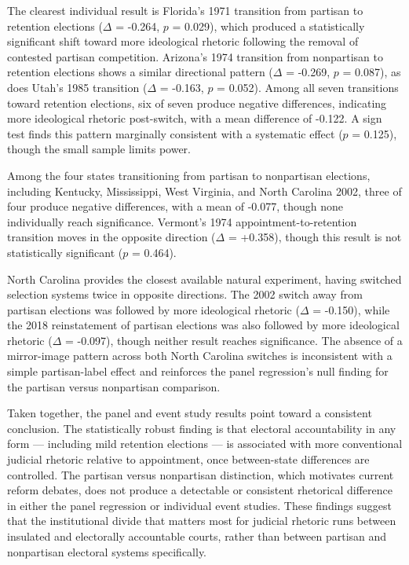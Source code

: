 The clearest individual result is Florida's 1971 transition from
partisan to retention elections (\(\Delta\) = -0.264, \(p\) = 0.029),
which produced a statistically significant shift toward more ideological
rhetoric following the removal of contested partisan competition.
Arizona's 1974 transition from nonpartisan to retention elections shows
a similar directional pattern (\(\Delta\) = -0.269, \(p\) = 0.087), as
does Utah's 1985 transition (\(\Delta\) = -0.163, \(p\) = 0.052). Among
all seven transitions toward retention elections, six of seven produce
negative differences, indicating more ideological rhetoric post-switch,
with a mean difference of -0.122. A sign test finds this pattern
marginally consistent with a systematic effect (\(p\) = 0.125), though
the small sample limits power.

Among the four states transitioning from partisan to nonpartisan
elections, including Kentucky, Mississippi, West Virginia, and North
Carolina 2002, three of four produce negative differences, with a mean
of -0.077, though none individually reach significance. Vermont's 1974
appointment-to-retention transition moves in the opposite direction
(\(\Delta\) = +0.358), though this result is not statistically
significant (\(p\) = 0.464).

North Carolina provides the closest available natural experiment, having
switched selection systems twice in opposite directions. The 2002 switch
away from partisan elections was followed by more ideological rhetoric
(\(\Delta\) = -0.150), while the 2018 reinstatement of partisan
elections was also followed by more ideological rhetoric (\(\Delta\) =
-0.097), though neither result reaches significance. The absence of a
mirror-image pattern across both North Carolina switches is inconsistent
with a simple partisan-label effect and reinforces the panel
regression's null finding for the partisan versus nonpartisan
comparison.

Taken together, the panel and event study results point toward a
consistent conclusion. The statistically robust finding is that
electoral accountability in any form --- including mild retention
elections --- is associated with more conventional judicial rhetoric
relative to appointment, once between-state differences are controlled.
The partisan versus nonpartisan distinction, which motivates current
reform debates, does not produce a detectable or consistent rhetorical
difference in either the panel regression or individual event studies.
These findings suggest that the institutional divide that matters most
for judicial rhetoric runs between insulated and electorally accountable
courts, rather than between partisan and nonpartisan electoral systems
specifically.


